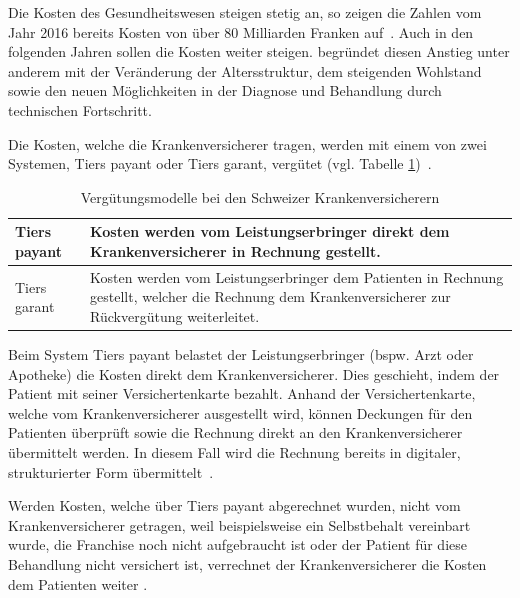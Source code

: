 Die Kosten des Gesundheitswesen steigen stetig an, so zeigen die Zahlen vom Jahr 2016 bereits Kosten von über 80 Milliarden Franken auf~\autocite{BfS2018}. Auch in den folgenden Jahren sollen die Kosten weiter steigen. \textcite{Kirchgassner2009} begründet diesen Anstieg unter anderem mit der Veränderung der Altersstruktur, dem steigenden Wohlstand sowie den neuen Möglichkeiten in der Diagnose und Behandlung durch technischen Fortschritt.

Die Kosten, welche die Krankenversicherer tragen, werden mit einem von zwei Systemen, Tiers payant oder Tiers garant, vergütet (vgl. Tabelle \ref{tiers})~\autocite{EDI2017}. 

\begin{table}[h!]
    \renewcommand{\arraystretch}{1.25}
    \setlength{\tabcolsep}{10pt}
    \caption{Vergütungsmodelle bei den Schweizer Krankenversicherern}
    \label{tiers}
    \begin{tabular}{| p{} | p{} |}
        \hline
         Tiers payant & Kosten werden vom Leistungserbringer direkt dem Kranken\-versicherer in Rechnung gestellt. \\
        \hline
         Tiers garant & Kosten werden vom Leistungserbringer dem Patienten in Rechnung gestellt, welcher die Rechnung dem Krankenversicherer zur Rückvergütung weiterleitet. \\
        \hline
    \end{tabular}
\end{table}

Beim System Tiers payant belastet der Leistungserbringer (bspw. Arzt oder Apotheke) die Kosten direkt dem Krankenversicherer. Dies geschieht, indem der Patient mit seiner Versichertenkarte bezahlt. Anhand der Versichertenkarte, welche vom Krankenversicherer ausgestellt wird, können Deckungen für den Patienten überprüft sowie die Rechnung direkt an den Krankenversicherer übermittelt werden. In diesem Fall wird die Rechnung bereits in digitaler, strukturierter Form übermittelt~\autocite{EDI2017}. 

Werden Kosten, welche über Tiers payant abgerechnet wurden, nicht vom Krankenversicherer getragen, weil beispielsweise ein Selbstbehalt vereinbart wurde, die Franchise noch nicht aufgebraucht ist oder der Patient für diese Behandlung nicht versichert ist, verrechnet der Krankenversicherer die Kosten dem Patienten weiter \autocite{EDI2017}.

